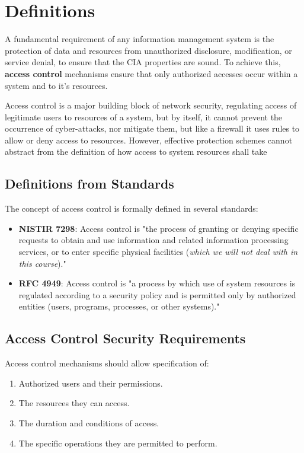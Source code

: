 \chapter{Definitions}
A fundamental requirement of any information management system is the
protection of data and resources from unauthorized disclosure,
modification, or service denial, to ensure that the CIA properties are
sound. To achieve this, \textbf{access control} mechanisms ensure that
only authorized accesses occur within a system and to it's resources.

Access control is a major building block of network security,
regulating access of legitimate users to resources of a system, but by
itself, it cannot prevent the occurrence of cyber-attacks, nor
mitigate them, but like a firewall it uses rules to allow or deny
access to resources. However, effective protection schemes cannot
abstract from the definition of how access to system resources shall
take

\section{Definitions from Standards}
The concept of access control is formally defined in several standards:

\begin{itemize}
    \item \textbf{NISTIR 7298}: Access control is "the process of
      granting or denying specific requests to obtain and use
      information and related information processing services, or to
      enter specific physical facilities (\textit{which we will not
      deal with in this course})."
    \item \textbf{RFC 4949}: Access control is "a process by which use
      of system resources is regulated according to a security policy
      and is permitted only by authorized entities (users, programs,
      processes, or other systems)."
\end{itemize}

\section{Access Control Security Requirements}
Access control mechanisms should allow specification of:

\begin{enumerate}
    \item Authorized users and their permissions.
    \item The resources they can access.
    \item The duration and conditions of access.
    \item The specific operations they are permitted to perform.
\end{enumerate}

